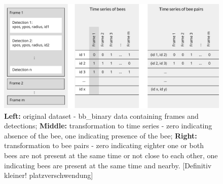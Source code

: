 \begin{figure}[htb]
	\centering
	\includegraphics[width=1.0\textwidth]{Figures/structure}
	\caption[Structure of Dataset]{\textbf{Left:} original dataset - bb\_binary data containing frames and detections; \textbf{Middle:} transformation to time series - zero indicating absence of the bee, one indicating presence of the bee; \textbf{Right:} transformation to bee pairs - zero indicating eighter one or both bees are not present at the same time or not close to each other, one indicating bees are present at the same time and nearby. [Definitiv kleiner! platzverschwendung]}
	\label{fig:structure}
\end{figure}

